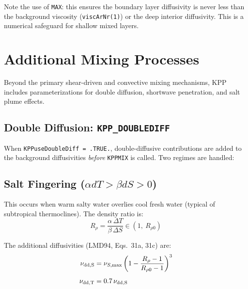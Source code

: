 \documentclass[12pt,letterpaper]{article}
\begin{document}
Note the use of \texttt{MAX}: this ensures the boundary layer  
diffusivity is never less than the background viscosity  
(\texttt{viscArNr(1)}) or the deep interior diffusivity. This is a  
numerical safeguard for shallow mixed layers.  
  
\section{Additional Mixing Processes}  
\label{sec:additional_mixing}  
  
Beyond the primary shear-driven and convective mixing mechanisms,  
KPP includes parameterizations for double diffusion, shortwave  
penetration, and salt plume effects.  
  
\subsection{Double Diffusion: \texttt{KPP\_DOUBLEDIFF}}  
\label{subsec:double_diffusion}  
  
When \texttt{KPPuseDoubleDiff = .TRUE.}, double-diffusive contributions  
are added to the background diffusivities \textit{before} \texttt{KPPMIX}  
is called. Two regimes are handled:  
  
\subsection{Salt Fingering ($\alpha dT > \beta dS > 0$)}  
  
This occurs when warm salty water overlies cool fresh water (typical of  
subtropical thermoclines). The density ratio is:  
\begin{equation}  
R_\rho = \frac{\alpha\,\Delta T}{\beta\,\Delta S}  
\in (1,\ R_{\rho 0})  
\end{equation}  
  
The additional diffusivities (LMD94, Eqs.\ 31a, 31c) are:  
\begin{align}  
\nu_{\rm dd,S} &= \nu_{S,\rm max}\left(1 - \frac{R_\rho - 1}  
                                               {R_{\rho 0} - 1}\right)^3 \\[4pt]  
\nu_{\rm dd,T} &= 0.7\,\nu_{\rm dd,S}  
\end{align}  
  
\end{document}
